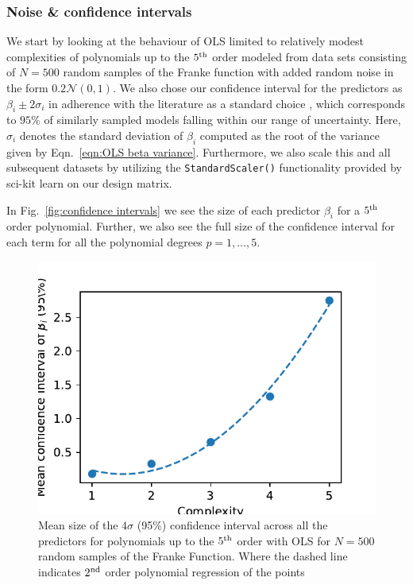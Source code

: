 \documentclass[reprint, english, nofootinbib]{revtex4-2}
\begin{document}
\subsubsection{Noise \& confidence intervals}

\noindent
We start by looking at the behaviour of OLS limited to relatively modest complexities of polynomials up to the $5^{\textup{th}}$ order modeled from data sets consisting of $N=500$ random samples of the Franke function with added random noise in the form $0.2\mathcal N(0, 1)$. We also chose our confidence interval for the predictors as $\beta_i\pm 2\sigma_i$ in adherence with the literature as a standard choice \cite{hastie}, which corresponds to $95\%$ of similarly sampled models falling within our range of uncertainty. Here, $\sigma_i$ denotes the standard deviation of $\beta_i$ computed as the root of the variance given by Eqn.~\ref{eqn:OLS beta variance}.
Furthermore, we also scale this and all subsequent datasets by utilizing the \lstinline{StandardScaler()} functionality provided by sci-kit learn on our design matrix.

In Fig.~\ref{fig:confidence intervals} we see the size of each predictor $\beta_i$ for a $5^{\textup{th}}$ order polynomial. Further, we also see the full size of the confidence interval for each term for all the polynomial degrees $p = 1,\dots, 5$.

\begin{figure}[h!tb]
    \centering
    \includegraphics[width=.8\columnwidth]{Franke_mean_confidence_interval.pdf}
    \caption{Mean size of the $4\sigma$ (95\%) confidence interval across all the predictors for polynomials up to the $5^{\textup{th}}$ order with OLS for $N=500$ random samples of the Franke Function. Where the dashed line indicates $2^\textup{nd}$ order polynomial regression of the points}
    \label{fig:mean confidence interval}
\end{figure}
\end{document}
